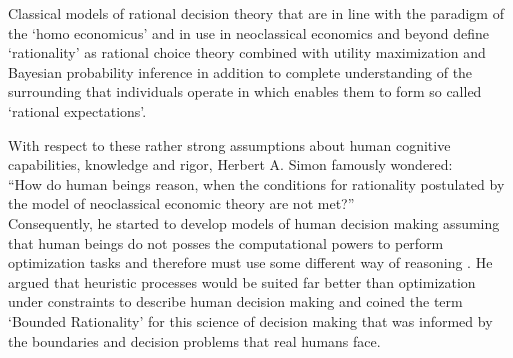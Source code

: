 
Classical models of rational decision theory that are in line with the paradigm of the `homo economicus' and in use in neoclassical economics and beyond define `rationality' as rational choice theory combined with utility maximization and Bayesian probability inference \citep{wilkinson2012introduction} in addition to complete understanding of the surrounding that individuals operate in which enables them to form so called `rational expectations'. 

With respect to these rather strong assumptions about human cognitive capabilities, knowledge and rigor, Herbert A. Simon famously wondered: \\

``How do human beings reason, when the conditions for rationality postulated by the model of neoclassical economic theory are not met?''  \citep{simon1989scientist}\\

Consequently, he started to develop models of human decision making assuming that human beings do not posses the computational powers to perform optimization tasks and therefore must use some different way of reasoning \citep{simon1982models}. He argued that heuristic processes would be suited far better than optimization under constraints to describe human decision making and coined the term `Bounded Rationality' for this science of decision making that was informed by the boundaries and decision problems that real humans face.\\

